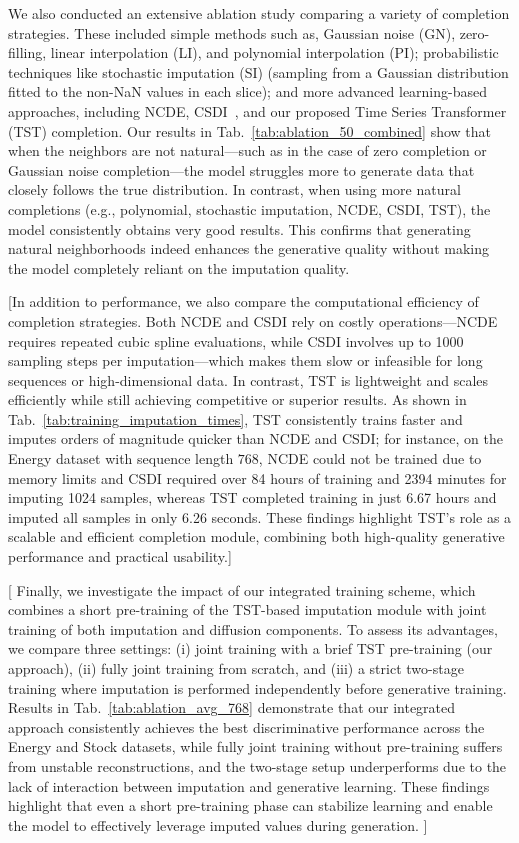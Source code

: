 \documentclass{article}
\theoremstyle{plain}
\theoremstyle{definition}
\theoremstyle{remark}
\newcommand {\idan}[1]{{\color{red}[#1]}}
\begin{document}
{We also conducted an extensive ablation study comparing a variety of completion strategies. These included simple methods such as, Gaussian noise (GN), zero-filling, linear interpolation (LI), and polynomial interpolation (PI); probabilistic techniques like stochastic imputation (SI) (sampling from a Gaussian distribution fitted to the non-NaN values in each slice); and more advanced learning-based approaches, including NCDE, CSDI~\cite{tashiro2021csdi}, and our proposed Time Series Transformer (TST) completion. Our results in Tab.~\ref{tab:ablation_50_combined} show that when the neighbors are not natural—such as in the case of zero completion or Gaussian noise completion—the model struggles more to generate data that closely follows the true distribution. In contrast, when using more natural completions (e.g., polynomial, stochastic imputation, NCDE, CSDI, TST), the model consistently obtains very good results. This confirms that generating natural neighborhoods indeed enhances the generative quality without making the model completely reliant on the imputation quality.

\idan{In addition to performance, we also compare the computational efficiency of completion strategies. Both NCDE and CSDI rely on costly operations—NCDE requires repeated cubic spline evaluations, while CSDI involves up to 1000 sampling steps per imputation—which makes them slow or infeasible for long sequences or high-dimensional data. In contrast, TST is lightweight and scales efficiently while still achieving competitive or superior results. As shown in Tab.~\ref{tab:training_imputation_times}, TST consistently trains faster and imputes orders of magnitude quicker than NCDE and CSDI; for instance, on the Energy dataset with sequence length $768$, NCDE could not be trained due to memory limits and CSDI required over 84 hours of training and 2394 minutes for imputing 1024 samples, whereas TST completed training in just 6.67 hours and imputed all samples in only 6.26 seconds. These findings highlight TST’s role as a scalable and efficient completion module, combining both high-quality generative performance and practical usability.}

\idan{
Finally, we investigate the impact of our integrated training scheme, which combines a short pre-training of the TST-based imputation module with joint training of both imputation and diffusion components. To assess its advantages, we compare three settings: (i) joint training with a brief TST pre-training (our approach), (ii) fully joint training from scratch, and (iii) a strict two-stage training where imputation is performed independently before generative training. Results in Tab.~\ref{tab:ablation_avg_768} demonstrate that our integrated approach consistently achieves the best discriminative performance across the Energy and Stock datasets, while fully joint training without pre-training suffers from unstable reconstructions, and the two-stage setup underperforms due to the lack of interaction between imputation and generative learning. These findings highlight that even a short pre-training phase can stabilize learning and enable the model to effectively leverage imputed values during generation.
}

}
\end{document}
